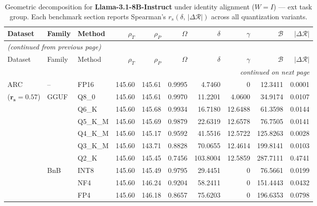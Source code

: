 \begingroup
\small
\setlength{\tabcolsep}{4pt}
\renewcommand{\arraystretch}{1.05}
\setlength{\LTcapwidth}{\textwidth}
\begin{longtable}{ll l rrrrrrr}
\caption{Geometric decomposition for \textbf{Llama-3.1-8B-Instruct} under identity alignment ($W{=}I$) --- ext task group. Each benchmark section reports Spearman's $r_s(\delta,\,|\Delta\mathcal{R}|)$ across all quantization variants.}\label{tab:llama_instruct_decomposition_ext}\\
\toprule
Dataset & Family & Method & $\rho_T$ & $\rho_P$ & $\Omega$ & $\delta$ & $\gamma$ & $\mathcal{B}$ & $|\Delta\mathcal{R}|$ \\
\midrule
\endfirsthead
\multicolumn{10}{l}{\small\itshape (continued from previous page)}\\
\toprule
Dataset & Family & Method & $\rho_T$ & $\rho_P$ & $\Omega$ & $\delta$ & $\gamma$ & $\mathcal{B}$ & $|\Delta\mathcal{R}|$ \\
\midrule
\endhead
\midrule
\multicolumn{10}{r}{\small\itshape continued on next page}\\
\endfoot
\bottomrule
\endlastfoot
ARC & -- & FP16 & 145.60 & 145.61 & 0.9995 & 4.7460 & \cellcolor{cyan!12} $0$ & 12.3411 & 0.0001 \\
{\small ($\mathbf{r_s{=}0.57}$)} & GGUF & Q8\_0 & 145.60 & 145.61 & 0.9970 & 11.2201 & 4.0600 & 34.9174 & 0.0107 \\
 &  & Q6\_K & 145.60 & 145.68 & 0.9934 & 16.7180 & 12.6488 & 61.3598 & 0.0144 \\
 &  & Q5\_K\_M & 145.60 & 145.69 & 0.9879 & 22.6319 & 12.6578 & 76.7505 & 0.0141 \\
 &  & Q4\_K\_M & 145.60 & 145.17 & 0.9592 & 41.5516 & 12.5722 & 125.8263 & 0.0028 \\
 &  & Q3\_K\_M & 145.60 & 143.71 & \cellcolor{red!18} 0.8828 & \cellcolor{red!18} 70.0655 & 12.4614 & \cellcolor{red!18} 199.8141 & \cellcolor{red!18} 0.0103 \\
 &  & Q2\_K & 145.60 & 145.45 & \cellcolor{red!35} 0.7456 & \cellcolor{red!35} 103.8004 & 12.5859 & \cellcolor{red!35} 287.7111 & \cellcolor{red!35} 0.4741 \\
 & BnB & INT8 & 145.60 & 145.49 & 0.9795 & 29.4451 & \cellcolor{cyan!12} $0$ & 76.5661 & 0.0199 \\
 &  & NF4 & 145.60 & 146.24 & \cellcolor{red!18} 0.9204 & \cellcolor{red!18} 58.2411 & \cellcolor{cyan!12} $0$ & \cellcolor{red!18} 151.4443 & \cellcolor{red!18} 0.0432 \\
 &  & FP4 & 145.60 & 146.18 & \cellcolor{red!18} 0.8657 & \cellcolor{red!18} 75.6203 & \cellcolor{cyan!12} $0$ & \cellcolor{red!18} 196.6353 & \cellcolor{red!18} 0.0798 \\

\end{longtable}
